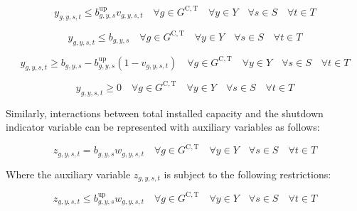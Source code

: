 \documentclass{article}
\newcommand{\sGeneratorsCandidateThermal}{G^{\mathrm{C,T}}}
\newcommand{\sYears}{Y}
\newcommand{\sScenarios}{S}
\newcommand{\sIntervals}{T}
\newcommand{\iGenerator}{g}
\newcommand{\iYear}{y}
\newcommand{\iScenario}{s}
\newcommand{\iInterval}{t}
\newcommand{\vStartupIndicator}[1][\iGenerator,\iYear,\iScenario,\iInterval]{v_{#1}}
\newcommand{\vShutdownIndicator}[1][\iGenerator,\iYear,\iScenario,\iInterval]{w_{#1}}
\newcommand{\vInstalledCapacityTotalScenario}[1][\iGenerator,\iYear,\iScenario]{b_{#1}}
\newcommand{\vInstalledCapacityStartupStateAux}[1][\iGenerator,\iYear,\iScenario,\iInterval]{y_{#1}}
\newcommand{\vInstalledCapacityShutdownStateAux}[1][\iGenerator,\iYear,\iScenario,\iInterval]{z_{#1}}
\begin{document}
\begin{equation}
\vInstalledCapacityStartupStateAux \leq \vInstalledCapacityTotalScenario^{\mathrm{up}} \vStartupIndicator \quad \forall \iGenerator \in \sGeneratorsCandidateThermal \quad \forall \iYear \in \sYears \quad \forall \iScenario \in \sScenarios \quad \forall \iInterval \in \sIntervals
\label{eqn: startup state aux variable block start}
\end{equation}

\begin{equation}
\vInstalledCapacityStartupStateAux \leq \vInstalledCapacityTotalScenario \quad \forall \iGenerator \in \sGeneratorsCandidateThermal \quad \forall \iYear \in \sYears \quad \forall \iScenario \in \sScenarios \quad \forall \iInterval \in \sIntervals
\end{equation}

\begin{equation}
\vInstalledCapacityStartupStateAux \geq \vInstalledCapacityTotalScenario - \vInstalledCapacityTotalScenario^{\mathrm{up}} \left(1 - \vStartupIndicator \right) \quad \forall \iGenerator \in \sGeneratorsCandidateThermal \quad \forall \iYear \in \sYears \quad \forall \iScenario \in \sScenarios \quad \forall \iInterval \in \sIntervals
\end{equation}

\begin{equation}
\vInstalledCapacityStartupStateAux \geq 0 \quad \forall \iGenerator \in \sGeneratorsCandidateThermal \quad \forall \iYear \in \sYears \quad \forall \iScenario \in \sScenarios \quad \forall \iInterval \in \sIntervals
\label{eqn: startup state aux variable block end}
\end{equation}

Similarly, interactions between total installed capacity and the shutdown indicator variable can be represented with auxiliary variables as follows:

\begin{equation}
\vInstalledCapacityShutdownStateAux = \vInstalledCapacityTotalScenario \vShutdownIndicator \quad \forall \iGenerator \in \sGeneratorsCandidateThermal \quad \forall \iYear \in \sYears \quad \forall \iScenario \in \sScenarios \quad \forall \iInterval \in \sIntervals
\end{equation}

Where the auxiliary variable $\vInstalledCapacityShutdownStateAux$ is subject to the following restrictions:

\begin{equation}
\vInstalledCapacityShutdownStateAux \leq \vInstalledCapacityTotalScenario^{\mathrm{up}} \vShutdownIndicator \quad \forall \iGenerator \in \sGeneratorsCandidateThermal \quad \forall \iYear \in \sYears \quad \forall \iScenario \in \sScenarios \quad \forall \iInterval \in \sIntervals
\label{eqn: shutdown state aux variable block start}
\end{equation}
\end{document}
